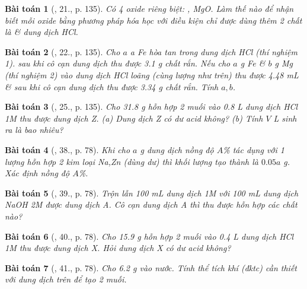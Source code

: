 \documentclass{article}
\newtheorem{baitoan}{Bài toán}
\begin{document}
\begin{baitoan}[\cite{An_Hoa_Hoc_nang_cao_8_9}, 21., p. 135]
	Có 4 oxide riêng biệt: {\rm{}, MgO}. Làm thế nào để nhận biết mỗi oxide bằng phương pháp hóa học với điều kiện chỉ được dùng thêm 2 chất là {\rm{}} \& dung dịch {\rm HCl}.
\end{baitoan}

\begin{baitoan}[\cite{An_Hoa_Hoc_nang_cao_8_9}, 22., p. 135]
	Cho $a$ {\rm a Fe} hòa tan trong dung dịch {\rm HCl} (thí nghiệm 1). sau khi cô cạn dung dịch thu được {\rm3.1 g} chất rắn. Nếu cho $a$ {\rm g Fe} \& $b$ {\rm g Mg} (thí nghiệm 2) vào dung dịch {\rm HCl} loãng (cùng lượng như trên) thu được {\rm4.48 mL } \& sau khi cô cạn dung dịch thu được {\rm3.34 g} chất rắn. Tính $a,b$.
\end{baitoan}

\begin{baitoan}[\cite{An_Hoa_Hoc_nang_cao_8_9}, 25., p. 135]
	Cho {\rm31.8 g} hỗn hợp 2 muối {\rm{}} vào {\rm0.8 L} dung dịch {\rm HCl 1M} thu được dung dịch Z. (a) Dung dịch Z có dư acid không? (b) Tính $V$ {\rm L } sinh ra là bao nhiêu?
\end{baitoan}

\begin{baitoan}[\cite{An_Hoa_Hoc_nang_cao_8_9}, 38., p. 78]
	Khi cho $a$ \emph{g} dung dịch \emph{} nồng độ $A$\emph{\%} tác dụng với 1 lượng hỗn hợp 2 kim loại \emph{Na,Zn} (dùng dư) thì khối lượng \emph{} tạo thành là $0.05a$ \emph{g}. Xác định nồng độ $A$\emph{\%}.
\end{baitoan}

\begin{baitoan}[\cite{An_Hoa_Hoc_nang_cao_8_9}, 39., p. 78]
	Trộn lẫn \emph{100 mL} dung dịch \emph{ 1M} với \emph{100 mL} dung dịch \emph{NaOH 2M} được dung dịch A. Cô cạn dung dịch A thì thu được hỗn hợp các chất nào?
\end{baitoan}

\begin{baitoan}[\cite{An_Hoa_Hoc_nang_cao_8_9}, 40., p. 78]
	Cho \emph{15.9 g} hỗn hợp 2 muối \emph{} vào \emph{0.4 L} dung dịch \emph{HCl 1M} thu được dung dịch X. Hỏi dung dịch X có dư acid không?
\end{baitoan}

\begin{baitoan}[\cite{An_Hoa_Hoc_nang_cao_8_9}, 41., p. 78]
	Cho \emph{6.2 g } vào nước. Tính thể tích khí \emph{} (đktc) cần thiết với dung dịch trên để tạo 2 muối.
\end{baitoan}
\end{document}
